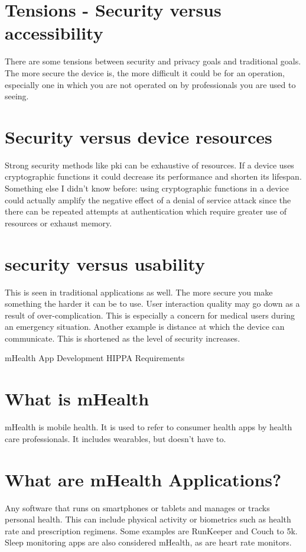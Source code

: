 \documentclass{article}
\begin{document}
\section*{Tensions - Security versus accessibility}
There are some tensions between security and privacy goals and traditional goals. The more secure the device is, the more difficult it could be for an operation, especially one in which you are not operated on by professionals you are used to seeing. 

\section*{Security versus device resources}
Strong security methods like pki can be exhaustive of resources. If a device uses cryptographic functions it could decrease its performance and shorten its lifespan. Something else I didn't know before: using cryptographic functions in a device could actually amplify the negative effect of a denial of service attack since the there can be repeated attempts at authentication which require greater use of resources or exhaust memory.

\section*{security versus usability}
This is seen in traditional applications as well. The more secure you make something the harder it can be to use. User interaction quality may go down as a result of over-complication. This is especially a concern for medical users during an emergency situation. Another example is distance at which the device can communicate. This is shortened as the level of security increases.

\newpage
\begin{center}
\Huge mHealth App Development HIPPA Requirements
\end{center}
\section*{What is mHealth}
mHealth is mobile health. It is used to refer to consumer health apps by health care professionals. It includes wearables, but doesn't have to.

\section*{What are mHealth Applications?}
Any software that runs on smartphones or tablets and manages or tracks personal health. This can include physical activity or biometrics such as health rate and prescription regimens. Some examples are RunKeeper and Couch to 5k. Sleep monitoring apps are also considered mHealth, as are heart rate monitors. 
\end{document}
